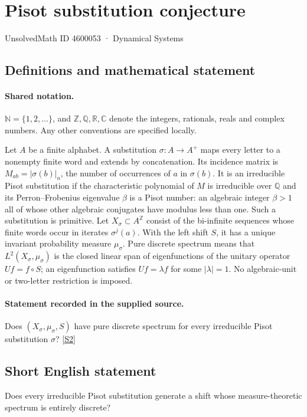 \documentclass[11pt]{article}
\newcommand{\sref}[2]{\hyperlink{source:#1:#2}{[S#2]}}
\begin{document}
\setcounter{section}{4600052}
\section{Pisot substitution conjecture}\label{4600053}
{\small\sffamily UnsolvedMath ID 4600053 · Dynamical Systems}
\subsection{Definitions and mathematical statement}

\paragraph{Shared notation.}$\mathbb N=\{1,2,\ldots\}$, and $\mathbb Z,\mathbb Q,\mathbb R,\mathbb C$ denote the integers, rationals, reals and complex numbers. Any other conventions are specified locally.


Let $A$ be a finite alphabet. A substitution $\sigma:A\to A^+$ maps every letter to a nonempty finite word and extends by concatenation. Its incidence matrix is $M_{ab}=|\sigma(b)|_a$, the number of occurrences of $a$ in $\sigma(b)$. It is an irreducible Pisot substitution if the characteristic polynomial of $M$ is irreducible over $\mathbb Q$ and its Perron--Frobenius eigenvalue $\beta$ is a Pisot number: an algebraic integer $\beta>1$ all of whose other algebraic conjugates have modulus less than one. Such a substitution is primitive. Let $X_\sigma\subset A^{\mathbb Z}$ consist of the bi-infinite sequences whose finite words occur in iterates $\sigma^j(a)$. With the left shift $S$, it has a unique invariant probability measure $\mu_\sigma$. Pure discrete spectrum means that $L^2(X_\sigma,\mu_\sigma)$ is the closed linear span of eigenfunctions of the unitary operator $Uf=f\circ S$; an eigenfunction satisfies $Uf=\lambda f$ for some $|\lambda|=1$. No algebraic-unit or two-letter restriction is imposed.
\paragraph{Statement recorded in the supplied source.}
Does $(X_\sigma,\mu_\sigma,S)$ have pure discrete spectrum for every irreducible Pisot substitution $\sigma$? \sref{4600053}{2}
\subsection{Short English statement}
Does every irreducible Pisot substitution generate a shift whose measure-theoretic spectrum is entirely discrete?
\end{document}
